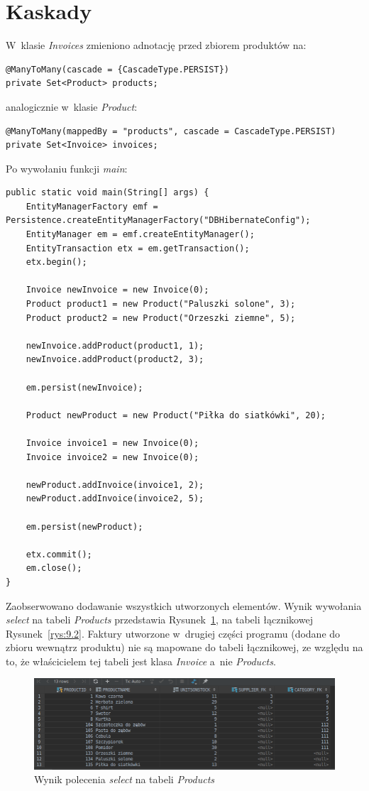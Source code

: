 \documentclass[12pt, a4paper]{mwart}
\begin{document}
\clearpage
\section{Kaskady}

W~klasie \textit{Invoices} zmieniono adnotację przed zbiorem produktów na:
\begin{lstlisting}
@ManyToMany(cascade = {CascadeType.PERSIST})
private Set<Product> products;
\end{lstlisting}

analogicznie w~klasie \textit{Product}:
\begin{lstlisting}
@ManyToMany(mappedBy = "products", cascade = CascadeType.PERSIST)
private Set<Invoice> invoices;
\end{lstlisting}

Po wywołaniu funkcji \textit{main}:
\begin{lstlisting}
public static void main(String[] args) {
	EntityManagerFactory emf = Persistence.createEntityManagerFactory("DBHibernateConfig");
	EntityManager em = emf.createEntityManager();
	EntityTransaction etx = em.getTransaction();
	etx.begin();

	Invoice newInvoice = new Invoice(0);
	Product product1 = new Product("Paluszki solone", 3);
	Product product2 = new Product("Orzeszki ziemne", 5);

	newInvoice.addProduct(product1, 1);
	newInvoice.addProduct(product2, 3);

	em.persist(newInvoice);

	Product newProduct = new Product("Piłka do siatkówki", 20);

	Invoice invoice1 = new Invoice(0);
	Invoice invoice2 = new Invoice(0);

	newProduct.addInvoice(invoice1, 2);
	newProduct.addInvoice(invoice2, 5);

	em.persist(newProduct);

	etx.commit();
	em.close();
}
\end{lstlisting}

Zaobserwowano dodawanie wszystkich utworzonych elementów. Wynik wywołania \textit{select} na tabeli \textit{Products} przedstawia Rysunek~\ref{rys:9.1}, na tabeli łącznikowej Rysunek~\ref{rys:9.2}. Faktury utworzone w~drugiej części programu (dodane do zbioru wewnątrz produktu) nie są mapowane do tabeli łącznikowej, ze względu na to, że właścicielem tej tabeli jest klasa \textit{Invoice} a~nie \textit{Products}.

\begin{figure}[ht]
  \centering
  \includegraphics[scale=0.5]{IX/9-1.png}
  \caption{Wynik polecenia \textit{select} na tabeli \textit{Products}}
  \label{rys:9.1}
\end{figure}
\end{document}
